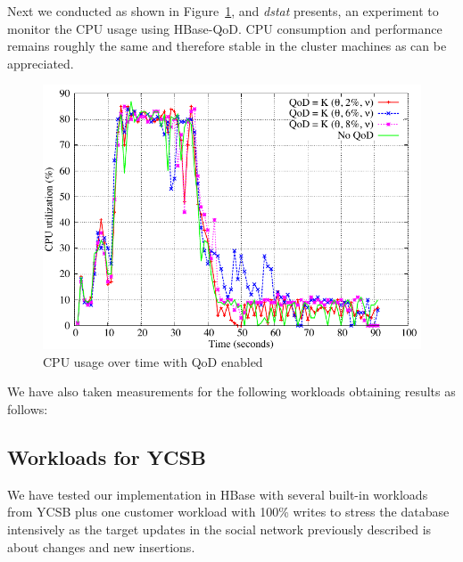 Next we conducted as shown in Figure~\ref{fig-cpu}, and \emph{dstat} presents, an experiment to monitor the CPU usage using HBase-QoD. CPU consumption and performance remains roughly the same and therefore stable in the cluster machines as can be appreciated.
\begin{figure}[h]
\centering
\includegraphics[width=0.8\linewidth]{figs/cpu.pdf}
\caption{CPU usage over time with QoD enabled}
\label{fig-cpu}
\end{figure}


We have also taken measurements for the following workloads obtaining results as follows:

\subsection{Workloads for YCSB}

We have tested our implementation in HBase with several built-in workloads from YCSB plus one customer workload with 100\% writes to stress the database intensively as the target updates in the social network previously described is about changes and new insertions.

